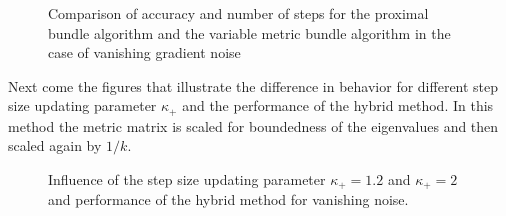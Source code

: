 \vspace{-1.5em}

\begin{figure}[H]
	\begin{subfigure}{0.49\textwidth}
	\end{subfigure}
	\begin{subfigure}{0.49\textwidth}
	\end{subfigure}
	\caption{Comparison of accuracy and number of steps for the proximal bundle algorithm and the variable metric bundle algorithm in the case of vanishing gradient noise}%
	\label{fig_van_grad_noise_large}%
\end{figure}

Next come the figures that illustrate the difference in behavior for different step size updating parameter \(\kappa_+\) and the performance of the hybrid method. In this method the metric matrix is scaled for boundedness of the eigenvalues and then scaled again by \(1/k\).


%

\begin{figure}[H]
	\begin{subfigure}{0.49\textwidth}
	\end{subfigure}
	\begin{subfigure}{0.49\textwidth}
	\end{subfigure}
	\caption{Influence of the step size updating parameter \(\kappa_+ = 1.2\) and \(\kappa_+ =2 \) and performance of the hybrid method for vanishing noise.}%
	\label{fig_van_noise_comp}%
\end{figure}


